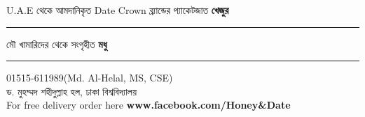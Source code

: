 \documentclass{article}
\begin{document}
\centering
{}
{
{\fontsize{57}{68}\selectfont {}U.A.E থেকে আমদানিকৃত Date Crown ব্র্যান্ডের প্যাকেটজাত \textbf{খেজুর}
\rule{\textwidth}{2pt}
মৌ খামারিদের থেকে সংগৃহীত \textbf{মধু}}
\rule{\textwidth}{2pt}
{\fontsize{36}{43.2}\selectfont {}01515-611989(Md. Al-Helal, MS, CSE)\\ ড. মুহম্মদ শহীদুল্লাহ হল, ঢাকা বিশ্ববিদ্যালয়\\} {\fontsize{20}{24} \selectfont {} For free delivery order here \textbf{www.facebook.com/Honey\&Date}\\\vspace{1.5cm}}
}
\end{document}

